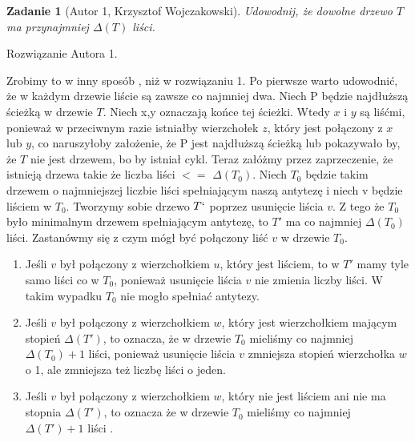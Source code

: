 \documentclass{mwart}
\newtheorem{zad}{Zadanie}[section]
\begin{document}
\begin{zad}[Autor 1, Krzysztof Wojczakowski]
    Udowodnij, że dowolne drzewo $T$ ma przynajmniej $\Delta(T)$ liści.
\end{zad}
\begin{mdframed}
    Rozwiązanie Autora 1.
\end{mdframed}
\begin{mdframed}
    Zrobimy to w inny sposób , niż w rozwiązaniu 1. Po pierwsze warto udowodnić, że w każdym drzewie liście są zawsze co najmniej dwa. Niech P będzie najdłuższą ścieżką w drzewie $T$. Niech x,y oznaczają końce tej ścieżki. Wtedy $x$ i $y$ są liśćmi, ponieważ w przeciwnym razie istniałby wierzchołek $z$, który jest połączony z $x$ lub $y$, co naruszyłoby założenie, że P jest najdłuższą ścieżką lub pokazywało by, że $T$ nie jest drzewem, bo by istniał cykl. 
    Teraz załóżmy przez zaprzeczenie, że istnieją drzewa takie że liczba liści $<=$ $\Delta(T_0)$. 
    Niech $T_0$ będzie takim drzewem o najmniejszej liczbie liści spełniającym naszą antytezę i niech v będzie liściem w $T_0$. Tworzymy sobie drzewo $T`$ poprzez usunięcie liścia $v$. Z tego że $T_0$ było minimalnym drzewem spełniającym antytezę, to $T'$ ma co najmniej $\Delta(T_0)$ liści. Zastanówmy się z czym mógł być połączony liść $v$ w drzewie $T_0$.
    \begin{enumerate}
        \item Jeśli $v$ był połączony z wierzchołkiem $u$, który jest liściem, to w $T'$ mamy tyle samo liści co w $T_0$, ponieważ usunięcie liścia $v$ nie zmienia liczby liści. W takim wypadku $T_0$ nie mogło spełniać antytezy.
        \item Jeśli $v$ był połączony z wierzchołkiem $w$, który jest wierzchołkiem mającym stopień $\Delta(T')$, to oznacza, że w drzewie $T_0$ mieliśmy co najmniej $\Delta(T_0) + 1$ liści, ponieważ usunięcie liścia $v$ zmniejsza stopień wierzchołka $w$ o 1, ale zmniejsza też liczbę liści o jeden. 
        \item Jeśli $v$ był połączony z wierzchołkiem $w$, który nie jest liściem ani nie ma stopnia $\Delta(T')$, to oznacza że w drzewie $T_0$ mieliśmy co najmniej $\Delta(T') + 1$ liści .
    \end{enumerate}
\end{mdframed}
\end{document}
